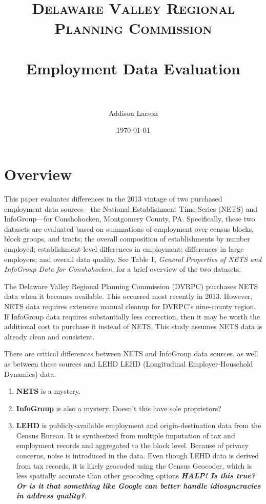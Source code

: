 \documentclass[paper = letter, fontsize = 11pt]{scrartcl}
\title{	
\normalfont \normalsize 
\textsc{Delaware Valley Regional Planning Commission} \\ [25pt]
\horrule{0.5pt} \\[0.4cm]
\huge Employment Data Evaluation \\
\horrule{2pt} \\[0.5cm]
}
\author{\normalsize Addison Larson}
\date{\normalsize\today}
\begin{document}
\maketitle
\section{Overview}
This paper evaluates differences in the 2013 vintage of two purchased employment data sources---the National Establishment Time-Series (NETS) and InfoGroup---for Conshohocken, Montgomery County, PA. Specifically, these two datasets are evaluated based on summations of employment over census blocks, block groups, and tracts; the overall composition of establishments by number employed; establishment-level differences in employment; differences in large employers; and overall data quality. See Table 1, \textit{General Properties of NETS and InfoGroup Data for Conshohocken}, for a brief overview of the two datasets.\par
The Delaware Valley Regional Planning Commission (DVRPC) purchases NETS data when it becomes available. This occurred most recently in 2013. However, NETS data requires extensive manual cleanup for DVRPC's nine-county region. If InfoGroup data requires substantially less correction, then it may be worth the additional cost to purchase it instead of NETS. This study assumes NETS data is already clean and consistent.\par
There are critical differences between NETS and InfoGroup data sources, as well as between these sources and LEHD LEHD (Longitudinal Employer-Household Dynamics) data.
\begin{enumerate}
	\item \textbf{NETS} is a mystery.
	\item \textbf{InfoGroup} is also a mystery. Doesn't this have sole proprietors?
	\item \textbf{LEHD} is publicly-available employment and origin-destination data from the Census Bureau. It is synthesized from multiple imputation of tax and employment records and aggregated to the block level. Because of privacy concerns, noise is introduced in the data. Even though LEHD data is derived from tax records, it is likely geocoded using the Census Geocoder, which is less spatially accurate than other geocoding options \textbf{\textit{HALP! Is this true? Or is it that something like Google can better handle idiosyncracies in address quality?}}.
\end{enumerate}
\end{document}
